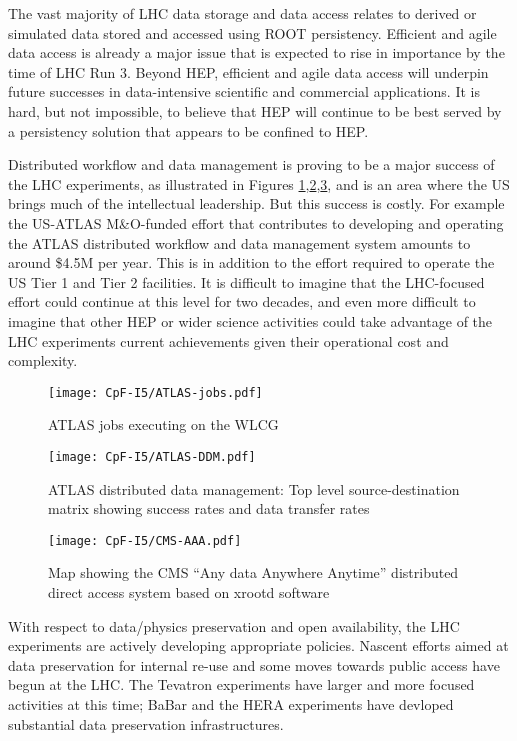 The vast majority of LHC data storage and data access relates to derived or simulated 
data stored and accessed using ROOT\cite{Antcheva:2009zz} persistency\cite{Canal:2011zz}.  Efficient and agile data access is 
already a major issue that is expected to rise in importance by the time of LHC Run 3.  
Beyond HEP, efficient and agile data access will underpin future successes in data-intensive 
scientific and commercial applications.  It is hard, but not impossible, to believe that HEP 
will continue to be best served by a persistency solution that appears to be confined to HEP.

Distributed workflow and data management is proving to be a major success of the LHC experiments, as 
illustrated in Figures \ref{fig:atlas-jobs},\ref{fig:atlas-ddm},\ref{fig:cms-aaa}, and is an area where the US brings much of the intellectual 
leadership.  But this success is costly. For example the US-ATLAS M\&O-funded effort that 
contributes to developing and operating the ATLAS distributed workflow and data management 
system amounts to around \$4.5M per year.  This is in addition to the effort required to operate 
the US Tier 1 and Tier 2 facilities.  It is difficult to imagine that the LHC-focused effort 
could continue at this level for two decades, and even more difficult to imagine that other HEP 
or wider science activities could take advantage of the LHC experiments current achievements 
given their operational cost and complexity. 
\begin{figure}[h]
\centering
\texttt{[image: CpF-I5/ATLAS-jobs.pdf]}
\caption{ATLAS jobs executing on the WLCG}
\label{fig:atlas-jobs}
\end{figure}
\begin{figure}[h!]
\centering
\texttt{[image: CpF-I5/ATLAS-DDM.pdf]}
\caption{ATLAS distributed data management: Top level source-destination matrix showing success rates and data transfer rates}
\label{fig:atlas-ddm}
\end{figure}
\begin{figure}[h!]
\centering
\texttt{[image: CpF-I5/CMS-AAA.pdf]}
\caption{Map showing the CMS ``Any data Anywhere Anytime'' distributed direct access system based on xrootd\cite{Bauerdick:2012st} software}
\label{fig:cms-aaa}
\end{figure}

With respect to data/physics preservation and open availability, the LHC experiments are actively 
developing appropriate policies. Nascent efforts aimed at data preservation for internal 
re-use and some moves towards public access have begun at the LHC.  The Tevatron experiments 
have larger and more focused activities at this time; BaBar and the HERA experiments have
devloped substantial data preservation infrastructures.

